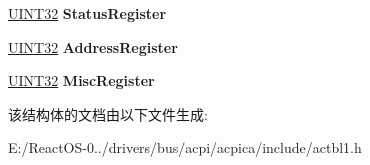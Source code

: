 \begin{DoxyCompactItemize}
\mbox{\label{structacpi__hest__ia__error__bank_abee5923b7b317c3b02fa709def91fa56}} 
\hyperlink{_processor_bind_8h_ae1e6edbbc26d6fbc71a90190d0266018}{U\+I\+N\+T32} {\bfseries Status\+Register}
\item 
\mbox{\label{structacpi__hest__ia__error__bank_a5eb33c463c91951ad7fa09a04665ebdf}} 
\hyperlink{_processor_bind_8h_ae1e6edbbc26d6fbc71a90190d0266018}{U\+I\+N\+T32} {\bfseries Address\+Register}
\item 
\mbox{\label{structacpi__hest__ia__error__bank_a426a8a6abfc3bc5280fddcd3c2802f65}} 
\hyperlink{_processor_bind_8h_ae1e6edbbc26d6fbc71a90190d0266018}{U\+I\+N\+T32} {\bfseries Misc\+Register}
\end{DoxyCompactItemize}


该结构体的文档由以下文件生成\+:\begin{DoxyCompactItemize}
\item 
E\+:/\+React\+O\+S-\/0../drivers/bus/acpi/acpica/include/actbl1.\+h\end{DoxyCompactItemize}
